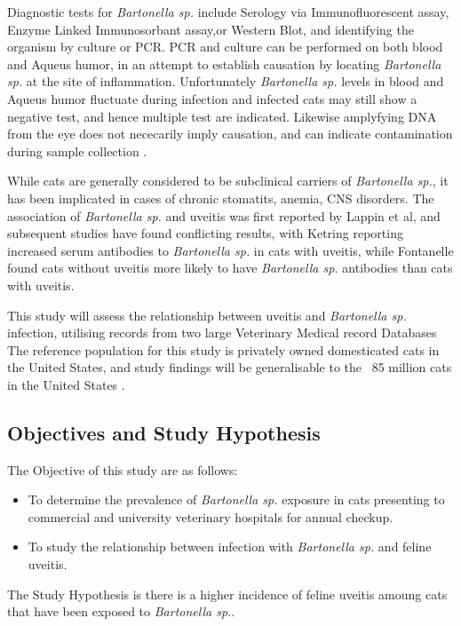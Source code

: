 \documentclass[11pt,twocolumn]{article}
\begin{document}
		Diagnostic tests for \emph{Bartonella sp.} include Serology via Immunofluorescent assay, Enzyme Linked Immunosorbant assay,or Western Blot, and identifying the organism by culture or PCR.
		PCR and culture can be performed on both blood and Aqueus humor, in an attempt to establish causation by locating \emph{Bartonella sp.} at the site of inflammation. Unfortunately \emph{Bartonella sp.} levels in blood and Aqueus humor fluctuate during infection and infected cats may still show a negative test, and hence multiple test are indicated\cite{Guptill2010}. Likewise amplyfying DNA from the eye does not nececarily imply causation, and can indicate contamination during sample collection \cite{Powell2010}.


		While cats are generally considered to be subclinical carriers of \emph{Bartonella sp.}, it has been implicated in cases of chronic stomatits, anemia, CNS disorders\cite{Nasir2005}.
		The association of \emph{Bartonella sp.} and uveitis was first reported by Lappin et al\cite{Lappin1999}, and subsequent studies have found conflicting results, with Ketring reporting increased serum antibodies to \emph{Bartonella sp.} in cats with uveitis\cite{Ketring2004}, while Fontanelle found cats without uveitis more likely to have \emph{Bartonella sp.} antibodies than cats with uveitis.
		

		This study will assess the relationship between uveitis and \emph{Bartonella sp.} infection, utilising records from two large Veterinary Medical record Databases \cite{bark12,UniversityVeterinary}	
		The reference population for this study is privately owned domesticated cats in the United States, and study findings will be generalisable to the ~85 million cats in the United States \cite{HSUSown}.

		\subsection{Objectives and Study Hypothesis}
			The Objective of this study are as follows: 
				\begin{itemize}
					\item To determine the prevalence of \emph{Bartonella sp.} exposure in cats presenting to commercial and university veterinary hospitals for annual checkup.
					\item To study the relationship between infection with \emph{Bartonella sp.} and feline uveitis.
				\end{itemize}
			The Study Hypothesis is there is a higher incidence of feline uveitis amoung cats that have been exposed to \emph{Bartonella sp.}.
\end{document}

